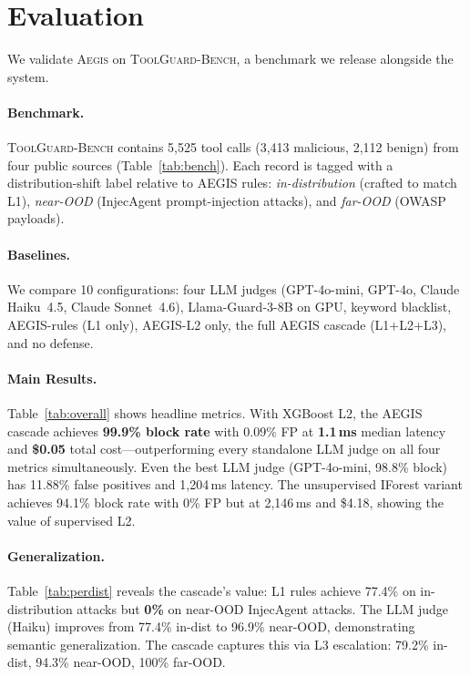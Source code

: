 \documentclass[11pt]{article}
\newcommand{\system}{\textsc{Aegis}\xspace}
\newcommand{\bench}{\textsc{ToolGuard-Bench}\xspace}
\begin{document}
\section{Evaluation}
\label{sec:eval}

We validate \system on \bench, a benchmark we release alongside the system.

\paragraph{Benchmark.}
\bench contains 5{,}525 tool calls (3{,}413 malicious, 2{,}112 benign) from four public sources (Table~\ref{tab:bench}).
Each record is tagged with a distribution-shift label relative to AEGIS rules: \emph{in-distribution} (crafted to match L1), \emph{near-OOD} (InjecAgent prompt-injection attacks), and \emph{far-OOD} (OWASP payloads).



\paragraph{Baselines.}
We compare 10 configurations: four LLM judges (GPT-4o-mini, GPT-4o, Claude Haiku~4.5, Claude Sonnet~4.6), Llama-Guard-3-8B on GPU, keyword blacklist, AEGIS-rules (L1 only), AEGIS-L2 only, the full AEGIS cascade (L1+L2+L3), and no defense.

\paragraph{Main Results.}
Table~\ref{tab:overall} shows headline metrics.
With XGBoost L2, the AEGIS cascade achieves \textbf{99.9\% block rate} with 0.09\% FP at \textbf{1.1\,ms} median latency and \textbf{\$0.05} total cost---outperforming every standalone LLM judge on all four metrics simultaneously.
Even the best LLM judge (GPT-4o-mini, 98.8\% block) has 11.88\% false positives and 1{,}204\,ms latency.
The unsupervised IForest variant achieves 94.1\% block rate with 0\% FP but at 2{,}146\,ms and \$4.18, showing the value of supervised L2.



\paragraph{Generalization.}
Table~\ref{tab:perdist} reveals the cascade's value: L1 rules achieve 77.4\% on in-distribution attacks but \textbf{0\%} on near-OOD InjecAgent attacks.
The LLM judge (Haiku) improves from 77.4\% in-dist to 96.9\% near-OOD, demonstrating semantic generalization.
The cascade captures this via L3 escalation: 79.2\% in-dist, 94.3\% near-OOD, 100\% far-OOD.
\end{document}
